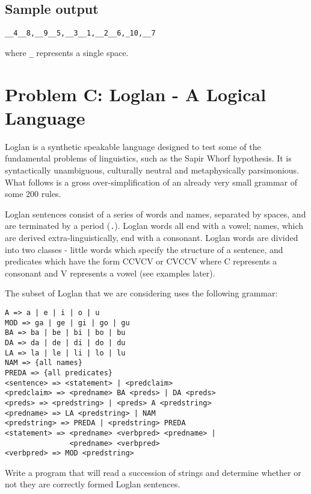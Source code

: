 \subsection*{Sample output}

\begin{verbatim}
__4__8,__9__5,__3__1,__2__6,_10,__7
\end{verbatim}

where \verb|_| represents a single space.

\newpage

\section*{Problem C: Loglan - A Logical Language}

Loglan is a synthetic speakable language designed to test
some of the fundamental problems of linguistics, such as
the Sapir Whorf hypothesis.  It is syntactically unambiguous,
culturally neutral and metaphysically parsimonious. What follows is
a gross over-simplification of an already very small grammar of
some 200 rules.

Loglan sentences consist of a series of words and names, separated
by spaces, and are terminated by a period (\verb|.|).  Loglan words all end
with a vowel; names, which are derived extra-linguistically, end with
a consonant.  Loglan words are divided into two classes - little words
which specify the structure of a sentence, and predicates which have
the form CCVCV or CVCCV where C represents a consonant and V represents
a vowel (see examples later).

The subset of Loglan that we are considering uses the following grammar:

\begin{verbatim}
A => a | e | i | o | u
MOD => ga | ge | gi | go | gu
BA => ba | be | bi | bo | bu 
DA => da | de | di | do | du 
LA => la | le | li | lo | lu 
NAM => {all names} 
PREDA => {all predicates}
<sentence> => <statement> | <predclaim> 
<predclaim> => <predname> BA <preds> | DA <preds> 
<preds> => <predstring> | <preds> A <predstring> 
<predname> => LA <predstring> | NAM 
<predstring> => PREDA | <predstring> PREDA 
<statement> => <predname> <verbpred> <predname> |
               <predname> <verbpred>
<verbpred> => MOD <predstring> 
\end{verbatim}

Write a program that will read a succession of strings and determine
whether or not they are correctly formed Loglan sentences.

